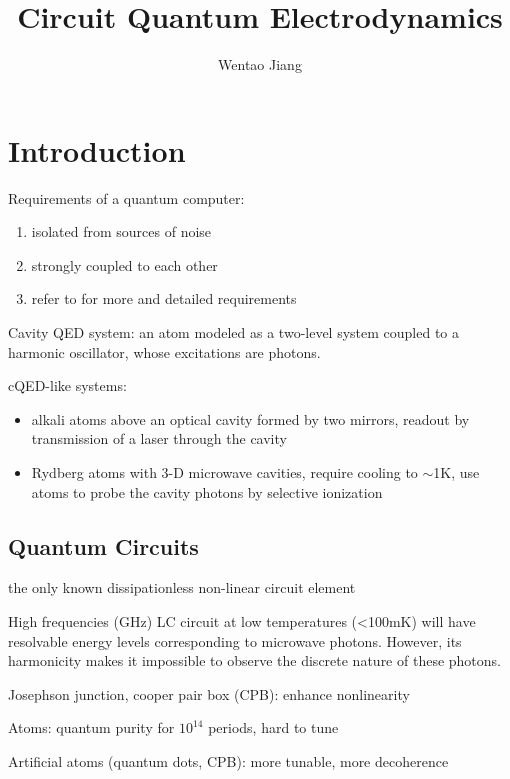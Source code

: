 \documentclass[8pt,a4paper,twocolumn]{article} %
\numberwithin{equation}{section} %
\begin{document}
\small
	\title{Circuit Quantum Electrodynamics}
	\author{Wentao Jiang}
	\date{}
	\maketitle
	\tableofcontents
	\section{Introduction} %
	\label{sec:introduction}
		Requirements of a quantum computer:
		\begin{enumerate}
    		\setlength{\itemsep}{1pt}
    		\setlength{\parsep}{1pt}
    		\setlength{\parskip}{1pt}
			\item isolated from sources of noise
			\item strongly coupled to each other
			\item refer to \cite{DiVincenzo2000} for more and detailed requirements
		\end{enumerate}
		Cavity QED system: an atom modeled as a two-level system coupled to a harmonic oscillator, whose excitations are photons.

		cQED-like systems: 
		\begin{itemize}
			\item alkali atoms above an optical cavity formed by two mirrors, readout by transmission of a laser through the cavity
			\item Rydberg atoms with 3-D microwave cavities, require cooling to $\sim$1K, use atoms to probe the cavity photons by selective ionization
		\end{itemize}

		\subsection{Quantum Circuits} %
		\label{sub:quantum_circuits}
			the only known dissipationless non-linear circuit element

			High frequencies (GHz) LC circuit at low temperatures (<100mK) will have resolvable energy levels corresponding to microwave photons. However, its harmonicity makes it impossible to observe the discrete nature of these photons.

			Josephson junction, cooper pair box (CPB): enhance nonlinearity

			Atoms: quantum purity for $10^{14}$ periods, hard to tune

			Artificial atoms (quantum dots, CPB): more tunable, more decoherence
\end{document}
